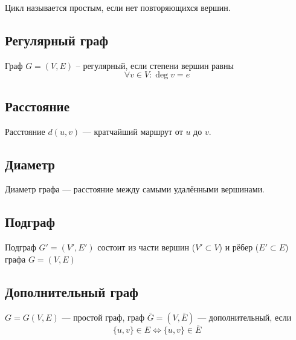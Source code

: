 \documentclass[a4paper,12pt]{article} %
\begin{document}
Цикл называется простым, если нет повторяющихся вершин.

\begin{center}
\end{center}
\subsection{Регулярный граф}
Граф $G = (V,E)$ -- регулярный, если степени вершин равны $$ \forall v \in V: \deg{v} = e$$

\subsection{Расстояние}

Расстояние $d(u,v)$ --- кратчайший маршрут от $u$ до $v$.

\subsection{Диаметр}

Диаметр графа --- расстояние между самыми удалёнными вершинами.

\subsection{Подграф}

Подграф $G' = (V',E')$ состоит из части вершин ($V' \subset V$) и рёбер ($E' 
\subset E$) графа $G = (V,E)$

\subsection{Дополнительный граф}

$G = G(V,E)$ --- простой граф, граф $\bar{G} = (V,\bar{E})$ --- дополнительный, если
$$ \{u,v\} \in E \Leftrightarrow \{u,v\} \in \bar{E}$$
\end{document}
